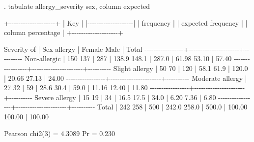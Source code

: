 \documentclass[
]{memoir}
\newenvironment{Shaded}{\begin{snugshade}}{\end{snugshade}}
\newcommand{\NormalTok}[1]{#1}
\begin{document}
\begin{Shaded}
\begin{Highlighting}[]
\NormalTok{. tabulate allergy\_severity sex, column expected}

\NormalTok{+{-}{-}{-}{-}{-}{-}{-}{-}{-}{-}{-}{-}{-}{-}{-}{-}{-}{-}{-}{-}+}
\NormalTok{| Key                |}
\NormalTok{|{-}{-}{-}{-}{-}{-}{-}{-}{-}{-}{-}{-}{-}{-}{-}{-}{-}{-}{-}{-}|}
\NormalTok{|     frequency      |}
\NormalTok{| expected frequency |}
\NormalTok{| column percentage  |}
\NormalTok{+{-}{-}{-}{-}{-}{-}{-}{-}{-}{-}{-}{-}{-}{-}{-}{-}{-}{-}{-}{-}+}

\NormalTok{     Severity of |          Sex}
\NormalTok{         allergy |    Female       Male |     Total}
\NormalTok{{-}{-}{-}{-}{-}{-}{-}{-}{-}{-}{-}{-}{-}{-}{-}{-}{-}+{-}{-}{-}{-}{-}{-}{-}{-}{-}{-}{-}{-}{-}{-}{-}{-}{-}{-}{-}{-}{-}{-}+{-}{-}{-}{-}{-}{-}{-}{-}{-}{-}}
\NormalTok{    Non{-}allergic |       150        137 |       287 }
\NormalTok{                 |     138.9      148.1 |     287.0 }
\NormalTok{                 |     61.98      53.10 |     57.40 }
\NormalTok{{-}{-}{-}{-}{-}{-}{-}{-}{-}{-}{-}{-}{-}{-}{-}{-}{-}+{-}{-}{-}{-}{-}{-}{-}{-}{-}{-}{-}{-}{-}{-}{-}{-}{-}{-}{-}{-}{-}{-}+{-}{-}{-}{-}{-}{-}{-}{-}{-}{-}}
\NormalTok{  Slight allergy |        50         70 |       120 }
\NormalTok{                 |      58.1       61.9 |     120.0 }
\NormalTok{                 |     20.66      27.13 |     24.00 }
\NormalTok{{-}{-}{-}{-}{-}{-}{-}{-}{-}{-}{-}{-}{-}{-}{-}{-}{-}+{-}{-}{-}{-}{-}{-}{-}{-}{-}{-}{-}{-}{-}{-}{-}{-}{-}{-}{-}{-}{-}{-}+{-}{-}{-}{-}{-}{-}{-}{-}{-}{-}}
\NormalTok{Moderate allergy |        27         32 |        59 }
\NormalTok{                 |      28.6       30.4 |      59.0 }
\NormalTok{                 |     11.16      12.40 |     11.80 }
\NormalTok{{-}{-}{-}{-}{-}{-}{-}{-}{-}{-}{-}{-}{-}{-}{-}{-}{-}+{-}{-}{-}{-}{-}{-}{-}{-}{-}{-}{-}{-}{-}{-}{-}{-}{-}{-}{-}{-}{-}{-}+{-}{-}{-}{-}{-}{-}{-}{-}{-}{-}}
\NormalTok{  Severe allergy |        15         19 |        34 }
\NormalTok{                 |      16.5       17.5 |      34.0 }
\NormalTok{                 |      6.20       7.36 |      6.80 }
\NormalTok{{-}{-}{-}{-}{-}{-}{-}{-}{-}{-}{-}{-}{-}{-}{-}{-}{-}+{-}{-}{-}{-}{-}{-}{-}{-}{-}{-}{-}{-}{-}{-}{-}{-}{-}{-}{-}{-}{-}{-}+{-}{-}{-}{-}{-}{-}{-}{-}{-}{-}}
\NormalTok{           Total |       242        258 |       500 }
\NormalTok{                 |     242.0      258.0 |     500.0 }
\NormalTok{                 |    100.00     100.00 |    100.00}

\NormalTok{          Pearson chi2(3) =   4.3089   Pr = 0.230}
\end{Highlighting}
\end{Shaded}
\end{document}
